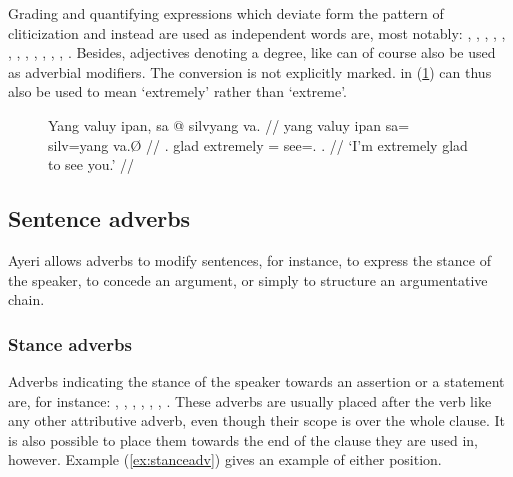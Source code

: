 Grading and quantifying expressions which deviate form the pattern of 
cliticization and instead are used as independent words are, most notably:
,
,
,
,
,
,
,
,
,
,
,
,
.
Besides, adjectives denoting a degree, like  can of course also be used as adverbial modifiers. The conversion is
not explicitly marked.  in (\ref{ex:adjasadv}) can thus also
be used to mean `extremely' rather than `extreme'.

\begin{figure}[h]
\ex\label{ex:adjasadv}
\begingl
	\gla Yang valuy ipan, sa @ silvyang va. //
	\glb yang valuy ipan sa= silv=yang va.Ø //
	\glc \Fsg{}.\Aarg{} glad extremely \PatT{}= see=\Fsg{}.\Aarg{} 
		\Second{}.\Top{} //
	\glft `I'm extremely glad to see you.' //
\endgl
\xe
\end{figure}


\subsection{Sentence adverbs}

Ayeri allows adverbs to modify sentences, for instance, to express the stance
of the speaker, to concede an argument, or simply to structure an argumentative
chain.

\subsubsection{Stance adverbs}

Adverbs indicating the stance of the speaker towards an assertion or a 
statement are, for instance:
, 
,
,
,
,
,
.
These adverbs are usually placed after the verb like any other attributive 
adverb, even though their scope is over the whole clause. It is also possible 
to place them towards the end of the clause they are used in, however. Example 
(\ref{ex:stanceadv}) gives an example of either position.

